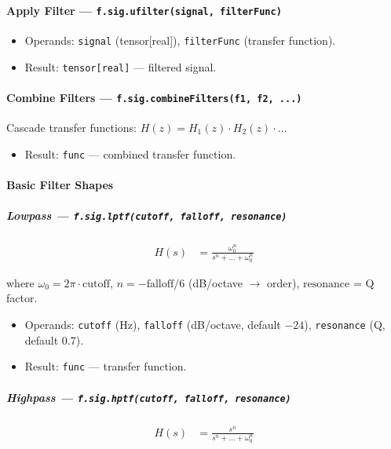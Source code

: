 \paragraph{Apply Filter --- \texttt{f.sig.ufilter(signal, filterFunc)}}
\begin{itemize}
\item Operands: \texttt{signal} (tensor[real]), \texttt{filterFunc} (transfer function).
\item Result: \texttt{tensor[real]} --- filtered signal.
\end{itemize}

\paragraph{Combine Filters --- \texttt{f.sig.combineFilters(f1, f2, ...)}}
Cascade transfer functions: $H(z) = H_1(z) \cdot H_2(z) \cdot \ldots$
\begin{itemize}
\item Result: \texttt{func} --- combined transfer function.
\end{itemize}

\paragraph{Basic Filter Shapes}

\subparagraph{Lowpass --- \texttt{f.sig.lptf(cutoff, falloff, resonance)}}

\begin{align}
H(s) &= \frac{\omega_0^n}{s^n + \ldots + \omega_0^n} \label{eq:sig-lptf}
\end{align}

where $\omega_0 = 2\pi \cdot \text{cutoff}$, $n = -\text{falloff}/6$ (dB/octave $\to$ order), $\text{resonance}$ = Q factor.

\begin{itemize}
\item Operands: \texttt{cutoff} (Hz), \texttt{falloff} (dB/octave, default $-24$), \texttt{resonance} (Q, default 0.7).
\item Result: \texttt{func} --- transfer function.
\end{itemize}

\subparagraph{Highpass --- \texttt{f.sig.hptf(cutoff, falloff, resonance)}}

\begin{align}
H(s) &= \frac{s^n}{s^n + \ldots + \omega_0^n} \label{eq:sig-hptf}
\end{align}

